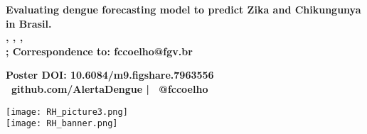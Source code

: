 \documentclass[a0,portrait]{a0poster}
\begin{document}


\begin{minipage}[b]{0.75\linewidth}
\VeryHuge \color{NavyBlue} \textbf{Evaluating dengue forecasting model to predict Zika and Chikungunya in Brasil.}
\color{Black}\\[0.4cm] 
\Large \textbf{
, 
, 
, 
} 
\\
\vspace{1cm}
\large \textbf{
; 
\large \textbf{Correspondence to: fccoelho@fgv.br}}
\begin{center}
    \large \textbf{Poster DOI: 10.6084/m9.figshare.7963556 \\ \faGithub \ github.com/AlertaDengue | \faTwitter \ @fccoelho}
\end{center}
\end{minipage}
%
\begin{minipage}[b]{0.25\linewidth}
\begin{center}
\texttt{[image: RH\_picture3.png]}\\ 
\texttt{[image: RH\_banner.png]}\\
\end{center}
\end{minipage}


\end{document}
